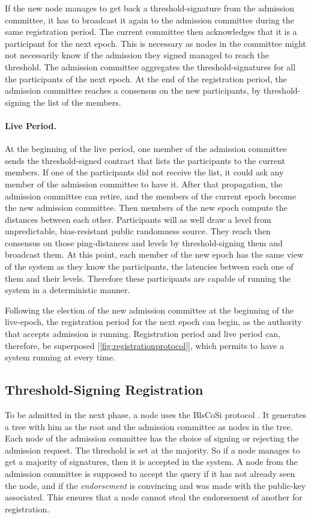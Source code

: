 \documentclass[a4paper,11pt,twoside=semi,openright]{report}
\begin{document}
If the new node manages to get back a threshold-signature from the admission
committee, it has to broadcast it again to the admission committee during the
same registration period. The current committee then acknowledges that it
is a participant for the next epoch. This is necessary as nodes in the
committee might not necessarily know if the admission they signed managed to
reach the threshold. The admission committee aggregates the
threshold-signatures for all the participants of the next epoch. At the end of
the registration period, the admission committee reaches a consensus on the
new participants, by threshold-signing the list of the members.  

\paragraph{Live Period.}
At the beginning of the live period, one member of the admission committee
sends the threshold-signed contract that lists the participants to the current
members. If one of the participants did not receive the list, it could ask any
member of the admission committee to have it. After that propagation, the
admission committee can retire, and the members of the current epoch become the
new admission committee. Then members of the new epoch compute the distances
between each other. Participants will as well draw a level from unpredictable,
bias-resistant public randomness source. They reach then consensus on those
ping-distances and levels by threshold-signing them and broadcast them. At this
point, each member of the new epoch has the same view of the system as they
know the participants, the latencies between each one of them and their levels.
Therefore these participants are capable of running the system in a
deterministic manner.

Following the election of the new admission committee at the beginning of the
live-epoch, the registration period for the next epoch can begin, as the
authority that accepts admission is running. Registration period and live
period can, therefore, be superposed [\autoref{fig:registrationprotocol}], which
permits to have a system running at every time. 

\subsection{Threshold-Signing Registration}
To be admitted in the next phase, a node uses the BlsCoSi protocol
\cite{Boneh2018}. It generates a tree with him as the root and the admission
committee as nodes in the tree. Each node of the admission committee has the
choice of signing or rejecting the admission request. The threshold is set at
the majority. So if a node manages to get a majority of signatures, then it is
accepted in the system. A node from the admission committee is supposed to
accept the query if it has not already seen the node, and if the
\textit{endorsement} is convincing and was made with the public-key associated.
This ensures that a node cannot steal the endorsement of another for
registration.  
\end{document}
